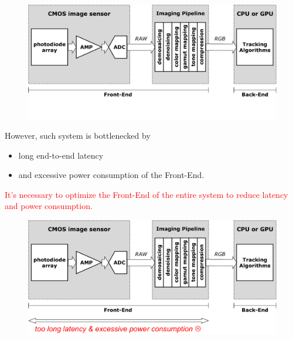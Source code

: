 \documentclass{beamer}
\begin{document}
\begin{frame}
    \begin{figure}[htpb]
        \begin{center}
            \includegraphics[width=1.0\linewidth]{fig/block3.pdf}
        \end{center}
    \end{figure}
\end{frame}

\begin{frame}
    However, such system is bottlenecked by
    \begin{itemize}
        \item long end-to-end latency
        \item and excessive power consumption of the Front-End.
    \end{itemize}
    \textcolor{red}{It's necessary to optimize the Front-End of the entire system to reduce latency and power consumption.}
\end{frame}

\begin{frame}
    \begin{figure}[htpb]
        \begin{center}
            \includegraphics[width=1.0\linewidth]{fig/block4.pdf}
        \end{center}
    \end{figure}
\end{frame}
\end{document}

